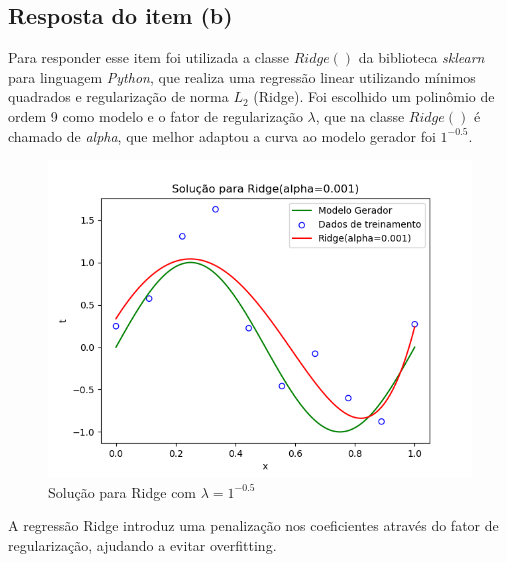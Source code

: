 \subsection{Resposta do item (b)}
Para responder esse item foi utilizada a classe $Ridge()$ da biblioteca \textit{sklearn} para linguagem \textit{Python}, que realiza uma regressão linear utilizando mínimos quadrados e regularização de norma $L_2$ (Ridge). Foi escolhido um polinômio de ordem 9 como modelo e o fator de regularização $\lambda$, que na classe $Ridge()$ é chamado de \textit{alpha}, que melhor adaptou a curva ao modelo gerador foi $1^{-0.5}$.
\begin{figure}[H]
    \centering
    \caption{Solução para Ridge com $\lambda = 1^{-0.5}$}
    \includegraphics[width=12cm]{E1_b.png}
\end{figure}
A regressão Ridge introduz uma penalização nos coeficientes através do fator de regularização, ajudando a evitar overfitting.

